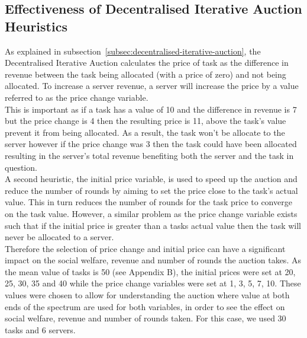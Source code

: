 \subsection{Effectiveness of Decentralised Iterative Auction Heuristics}
\label{subsec:effectiveness-of-decentralised-iterative-auction-heuristics}
As explained in subsection~\ref{subsec:decentralised-iterative-auction}, the Decentralised Iterative Auction
calculates the price of task as the difference in revenue between the task being allocated (with a price of
zero) and not being allocated. To increase a server revenue, a server will increase the price by a value referred to as
the price change variable. \\
This is important as if a task has a value of 10 and the difference in revenue is 7 but the
price change is 4 then the resulting price is 11, above the task's value prevent it from being allocated. As a result,
the task won't be allocate to the server however if the price change was 3 then the task could have been allocated
resulting in the server's total revenue benefiting both the server and the task in question. \\
A second heuristic, the initial price variable, is used to speed up the auction and reduce the number of rounds by
aiming to set the price close to the task's actual value. This in turn reduces the number of rounds for the task price
to converge on the task value. However, a similar problem as the price change variable exists such that if the initial
price is greater than a tasks actual value then the task will never be allocated to a server. \\
Therefore the selection of price change and initial price can have a significant impact on the social welfare, revenue
and number of rounds the auction takes. As the mean value of tasks is 50 (see Appendix B),
the initial prices were set at 20, 25, 30, 35 and 40 while the price change variables were set at 1, 3, 5, 7, 10. These
values were chosen to allow for understanding the auction where value at both ends of the spectrum are used for both
variables, in order to see the effect on social welfare, revenue and number of rounds taken. For this case, we used
30 tasks and 6 servers.

